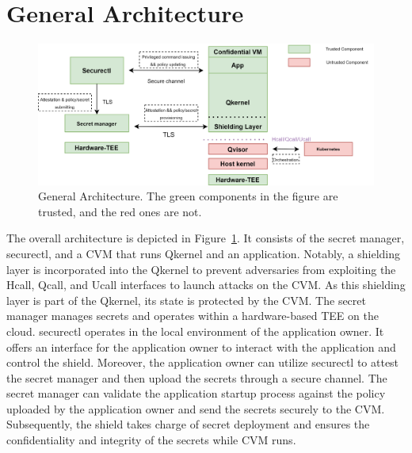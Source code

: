 
 


\section{General Architecture}
\label{sec:General_Architecture}
\begin{figure}[!htb]
    \centering
    \includegraphics[height=0.3\textheight, width=1\textwidth]{images/genaral_architechture.png}
    \caption[General Architecture]{General Architecture. The green components in the figure are trusted, and the red ones are not.}
    \label{fig:genaral_architechture}
\end{figure}

The overall architecture is depicted in Figure~\ref{fig:genaral_architechture}. It consists of the secret manager, securectl, and a \acrshort{CVM} that runs Qkernel and an application. Notably, a shielding layer is incorporated into the Qkernel to prevent adversaries from exploiting the Hcall, Qcall, and Ucall interfaces to launch attacks on the CVM. As this shielding 
layer is part of the Qkernel, its state is protected by the \acrshort{CVM}. The secret manager manages secrets and operates within a hardware-based TEE on the cloud. securectl operates in the local environment of the application owner. It offers an interface for the application owner to interact with the application and control the shield. Moreover, the application 
owner can utilize securectl to attest the secret manager and then upload the secrets through a secure channel. The secret manager can validate the application startup process against the policy uploaded by the application owner and send the secrets securely to the \acrshort{CVM}. Subsequently, the shield takes charge of secret deployment and ensures the confidentiality 
and integrity of the secrets while \acrshort{CVM} runs.

